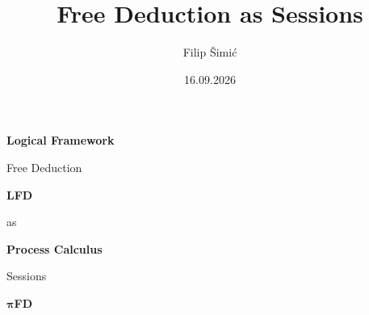 \documentclass[11pt, aspectratio=169, xcolor={dvipsnames}, usepdftitle=false]{beamer}
\title{Free Deduction as Sessions}
\author{Filip Šimić}
\date{16.09.2026}
\begin{document}
\frame{\titlepage}

\begin{frame}
  \begin{center}
  \begin{minipage}[t]{0.4\textwidth}
    \centering
    \textbf{Logical Framework}

    \bigskip

    {\LARGE Free Deduction}

    \bigskip

    \textbf{LFD}

    \bigskip

    \begin{flushleft}
  \end{flushleft}
  \end{minipage}\hfill
  \begin{minipage}[t]{0.05\textwidth}
    \centering
    \phantom{FOO}

    \bigskip

    \large as

    \bigskip

    \phantom{foo}
  \end{minipage}\hfill
  \begin{minipage}[t]{0.4\textwidth}
    \centering
    \textbf{Process Calculus}

    \bigskip

    {\LARGE Sessions}

    \bigskip

    $\boldsymbol{\pi}$\textbf{FD}

    \bigskip


\end{minipage}
\end{center}
\end{frame}
\end{document}

